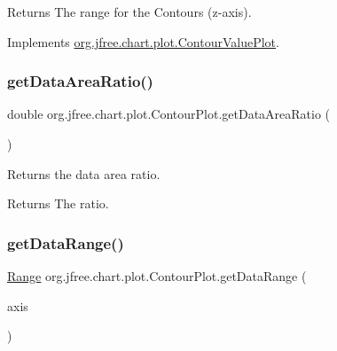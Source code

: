 \begin{DoxyReturn}{Returns}
The range for the Contours (z-\/axis). 
\end{DoxyReturn}


Implements \mbox{\hyperlink{interfaceorg_1_1jfree_1_1chart_1_1plot_1_1_contour_value_plot_a10d08f881ab3a2a7dd3a38bb0f7e267e}{org.\+jfree.\+chart.\+plot.\+Contour\+Value\+Plot}}.

\mbox{\label{classorg_1_1jfree_1_1chart_1_1plot_1_1_contour_plot_a98f307eb91af31c87506ee46fb30fb53}} 
\subsubsection{\texorpdfstring{get\+Data\+Area\+Ratio()}{getDataAreaRatio()}}
{\footnotesize\ttfamily double org.\+jfree.\+chart.\+plot.\+Contour\+Plot.\+get\+Data\+Area\+Ratio (\begin{DoxyParamCaption}{ }\end{DoxyParamCaption})}

Returns the data area ratio.

\begin{DoxyReturn}{Returns}
The ratio. 
\end{DoxyReturn}
\mbox{\label{classorg_1_1jfree_1_1chart_1_1plot_1_1_contour_plot_af6342c1dfe5a7e570d22a3a039574ac5}} 
\subsubsection{\texorpdfstring{get\+Data\+Range()}{getDataRange()}}
{\footnotesize\ttfamily \mbox{\hyperlink{classorg_1_1jfree_1_1data_1_1_range}{Range}} org.\+jfree.\+chart.\+plot.\+Contour\+Plot.\+get\+Data\+Range (\begin{DoxyParamCaption}\item[{\mbox{\hyperlink{classorg_1_1jfree_1_1chart_1_1axis_1_1_value_axis}{Value\+Axis}}}]{axis }\end{DoxyParamCaption})}

